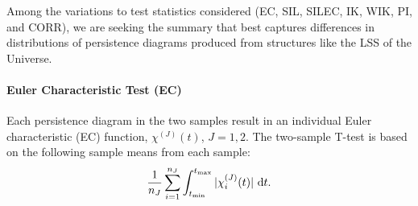 \documentclass[12pt]{article}
\begin{document}




Among the variations to test statistics considered (EC, SIL, SILEC, IK, WIK, PI, and CORR), we are seeking the summary that best captures differences in distributions of persistence diagrams produced from structures like the LSS of the Universe.

\paragraph{Euler Characteristic Test (EC)}
Each persistence diagram in the two samples result in an individual Euler characteristic (EC) function, $\chi^{(J)}(t)$,  $J = 1, 2$. The two-sample T-test is based on the following sample means from each  sample:
\begin{equation*}
\frac{1}{n_J}\sum_{i = 1}^{n_J} \int_{t_{\min}}^{t_{\max}} | \chi_i^{(J)}(t) | \textup{ d}t.
\end{equation*}
\end{document}

